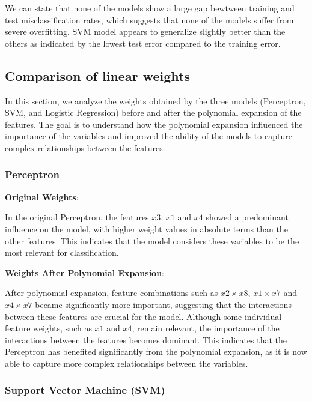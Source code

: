 \documentclass[a4paper, 10pt]{article}
\begin{document}
We can state that none of the models show a large gap bewtween training and test misclassification rates, which suggests that none of the models suffer from severe overfitting. 
SVM model appears to generalize slightly better than the others as indicated by the lowest test error compared to the training error. 

\newpage
\subsection{Comparison of linear weights}

In this section, we analyze the weights obtained by the three models (Perceptron, SVM, and Logistic Regression) before and after the polynomial expansion of the features. The goal is to understand how the polynomial expansion influenced the importance of the variables and improved the ability of the models to capture complex relationships between the features.

\subsubsection{Perceptron}

\textbf{Original Weights}: 

In the original Perceptron, the features \( x3 \), \( x1 \) and \( x4 \) showed a predominant influence on the model, with higher weight values in absolute terms than the other features. This indicates that the model considers these variables to be the most relevant for classification.

\vspace{0.5cm}
\noindent \textbf{Weights After Polynomial Expansion}: 

After polynomial expansion, feature combinations such as \( x2 \times x8 \), \( x1 \times x7 \) and \( x4 \times x7 \) became significantly more important, suggesting that the interactions between these features are crucial for the model. Although some individual feature weights, such as \( x1 \) and \( x4 \), remain relevant, the importance of the interactions between the features becomes dominant. This indicates that the Perceptron has benefited significantly from the polynomial expansion, as it is now able to capture more complex relationships between the variables.

\subsubsection{Support Vector Machine (SVM)}
\end{document}
